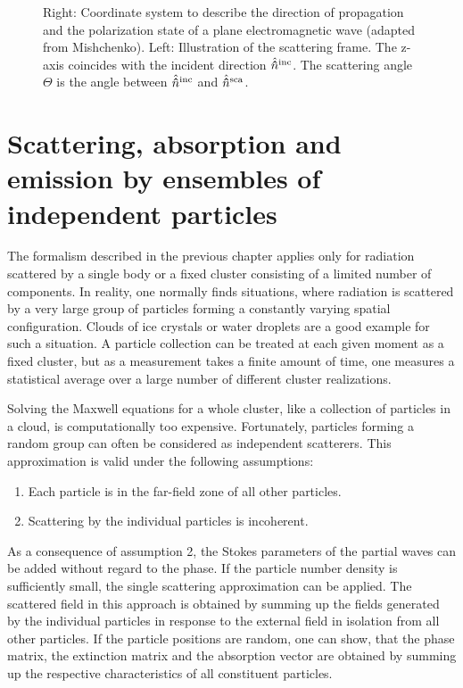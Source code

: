 \begin{figure}[t]
\begin{minipage}{.4\textwidth}
 \end{minipage}%
   \caption{
Right: Coordinate system to describe the direction of propagation and the
polarization state of a plane electromagnetic wave (adapted from Mishchenko).
Left: Illustration of the scattering frame. The z-axis coincides with the
incident direction $\hat{{\bf \hat{n}}}^{\mathrm{inc}}$. The scattering angle $\Theta$ is the
angle between  $\hat{{\bf \hat{n}}}^{\mathrm{inc}}$ and $\hat{{\bf \hat{n}}}^{\mathrm{sca}}$.
           }
  \label{fig:RT_theory_coordinates_and_frames}  
\end{figure}


\section[Particle Ensembles]
{Scattering, absorption and emission by ensembles of independent particles}
\label{sec:rtetheory:part_ensembles}

The formalism described in the previous chapter applies only for
radiation scattered by a single body or a fixed cluster consisting of
a limited number of components. In reality, one normally finds
situations, where radiation is scattered by a very large group of
particles forming a constantly varying spatial configuration. Clouds
of ice crystals or water droplets are a good example for such a
situation. A particle collection can be treated at each given moment
as a fixed cluster, but as a measurement takes a finite amount of
time, one measures a statistical average over a large number of
different cluster realizations.

Solving the Maxwell equations for a whole cluster, like a collection
of particles in a cloud, is computationally too expensive.
Fortunately, particles forming a random group can often be considered
as independent scatterers. This approximation is valid under the
following assumptions:
\begin{enumerate}
\item Each particle is in the far-field zone of all other particles.
\item Scattering by the individual particles is incoherent.
\end{enumerate}

As a consequence of assumption 2, the Stokes parameters of the partial
waves can be added without regard to the phase. If the particle number
density is sufficiently small, the single scattering approximation can
be applied. The scattered field in this approach is obtained by
summing up the fields generated by the individual particles in
response to the external field in isolation from all other particles.
If the particle positions are random, one can show, that the phase
matrix, the extinction matrix and the absorption vector are obtained
by summing up the respective characteristics of all constituent
particles.

